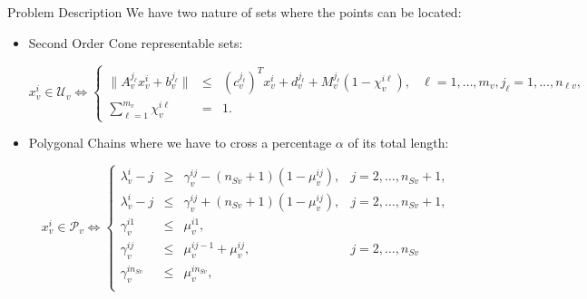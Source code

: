 \documentclass[slidestop,usepdftitle=false,10pt]{beamer}
\begin{document}
	\begin{frame}{Problem Description}
    We have two nature of sets where the points can be located:
    \begin{itemize}
    	
        \item \begin{small} Second Order Cone representable sets: \end{small}
        \begin{tiny}
        \begin{equation}\label{U-C}\tag{$\mathcal U$-C}
             x_v^i\in \mathcal U_v \Longleftrightarrow
             \left\{
             \begin{array}{cclr}
              \|A_v^{j_\ell} x_v^i + b_v^{j_\ell}\|& \leq & (c_v^{j_\ell})^T x_v^i + d_v^{j_\ell}+ M_v^{j_\ell}(1-\chi_v^{i\ell}), & \ell=1,\ldots,m_v, j_\ell=1,\ldots,n_{\ell v}, \\
             \sum_{\ell = 1}^{m_v} \chi_v^{i\ell}  & =    & 1.
             \end{array}
             \right.
        \end{equation}
        \end{tiny}
        \item \begin{small} Polygonal Chains where we have to cross a percentage $\alpha$ of its total length: \end{small}
        \begin{tiny}
        \begin{equation}\label{P-C}\tag{$\mathcal P$-C}
             x_v^i\in \mathcal P_v \Longleftrightarrow
             \left\{
             \begin{array}{cclr}
              \lambda_v^i - j                    & \geq & \gamma_v^{ij} - (n_{Sv}+1)(1-\mu_v^{ij}),                            & j=2,\ldots,n_{Sv}+1, \\
              \lambda_v^i - j                    & \leq & \gamma_v^{ij} + (n_{Sv}+1)(1-\mu_v^{ij}),                            & j=2,\ldots,n_{Sv}+1, \\
              \gamma_v^{i1}                      & \leq & \mu_v^{i1}, & \\
              \gamma_v^{ij}                      & \leq & \mu_v^{ij-1} + \mu_v^{ij},                                         & j=2,\ldots,n_{Sv}\\
              \gamma_v^{in_{Sv}}                    & \leq & \mu_v^{in_{Sv}}, \\

\end{array}
\end{equation}
\end{tiny}
\end{itemize}
\end{frame}
\end{document}
